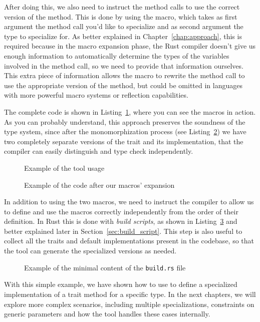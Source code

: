 After doing this, we also need to instruct the method calls to use the correct version of the method.
This is done by using the  macro, which takes as first argument the method call you'd like to specialize and as second argument the type to specialize for.
As better explained in Chapter~\ref{chap:approach}, this is required because in the macro expansion phase, the Rust compiler doesn't give us enough information to automatically determine the types of the variables involved in the method call, so we need to provide that information ourselves.
This extra piece of information allows the macro to rewrite the method call to use the appropriate version of the method, but could be omitted in languages with more powerful macro systems or reflection capabilities.

The complete code is shown in Listing~\ref{fig:monomorphic_specialization_pre}, where you can see the macros in action.
As you can probably understand, this approach preserves the soundness of the type system, since after the monomorphization process (see Listing~\ref{fig:monomorphic_specialization_post}) we have two completely separate versions of the trait and its implementation, that the compiler can easily distinguish and type check independently.

\begin{figure}[htbp!]
	\centering
	\captionsetup{type=listing,skip=2pt}
	\caption{Example of the tool usage}
	\label{fig:monomorphic_specialization_pre}
\end{figure}

\begin{figure}[htbp!]
	\centering
	\captionsetup{type=listing,skip=2pt}
	\caption{Example of the code after our macros' expansion}
	\label{fig:monomorphic_specialization_post}
\end{figure}

In addition to using the two macros, we need to instruct the compiler to allow us to define and use the macros correctly independently from the order of their definition.
In Rust this is done with \textit{build scripts}, as shown in Listing~\ref{fig:monomorphic_specialization_build_rs} and better explained later in Section~\ref{sec:build_script}.
This step is also useful to collect all the traits and default implementations present in the codebase, so that the tool can generate the specialized versions as needed.

\begin{figure}[htbp!]
	\centering
	\captionsetup{type=listing,skip=2pt}
	\caption{Example of the minimal content of the \texttt{build.rs} file}
	\label{fig:monomorphic_specialization_build_rs}
\end{figure}

With this simple example, we have shown how to use \mytool{} to define a specialized implementation of a trait method for a specific type.
In the next chapters, we will explore more complex scenarios, including multiple specializations, constraints on generic parameters and how the tool handles these cases internally.